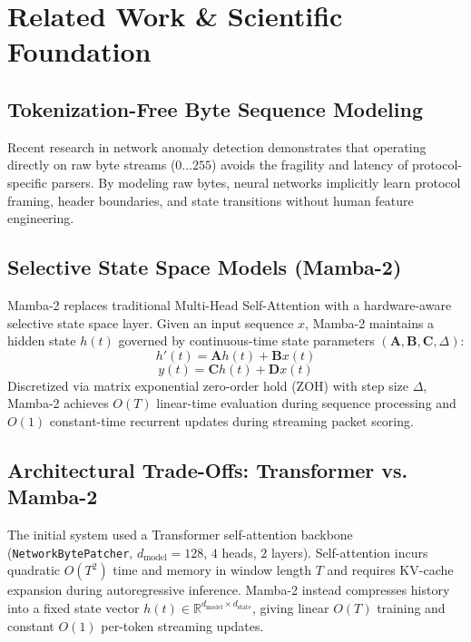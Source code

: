 \documentclass[10pt,journal,compsoc]{IEEEtran}
\begin{document}
\section{Related Work \& Scientific Foundation}

\subsection{Tokenization-Free Byte Sequence Modeling}
Recent research in network anomaly detection demonstrates that operating directly on raw byte streams ($0 \dots 255$) avoids the fragility and latency of protocol-specific parsers. By modeling raw bytes, neural networks implicitly learn protocol framing, header boundaries, and state transitions without human feature engineering.

\subsection{Selective State Space Models (Mamba-2)}
Mamba-2 replaces traditional Multi-Head Self-Attention with a hardware-aware selective state space layer. Given an input sequence $x$, Mamba-2 maintains a hidden state $h(t)$ governed by continuous-time state parameters $(\mathbf{A}, \mathbf{B}, \mathbf{C}, \Delta)$:
\begin{equation}
    h'(t) = \mathbf{A} h(t) + \mathbf{B} x(t)
\end{equation}
\begin{equation}
    y(t) = \mathbf{C} h(t) + \mathbf{D} x(t)
\end{equation}
Discretized via matrix exponential zero-order hold (ZOH) with step size $\Delta$, Mamba-2 achieves $O(T)$ linear-time evaluation during sequence processing and $O(1)$ constant-time recurrent updates during streaming packet scoring.

\subsection{Architectural Trade-Offs: Transformer vs. Mamba-2}
The initial system used a Transformer self-attention backbone (\texttt{NetworkBytePatcher}, $d_{\text{model}}=128$, $4$ heads, $2$ layers). Self-attention incurs quadratic $O(T^2)$ time and memory in window length $T$ and requires KV-cache expansion during autoregressive inference. Mamba-2 instead compresses history into a fixed state vector $h(t) \in \mathbb{R}^{d_{\text{model}} \times d_{\text{state}}}$, giving linear $O(T)$ training and constant $O(1)$ per-token streaming updates.
\end{document}
